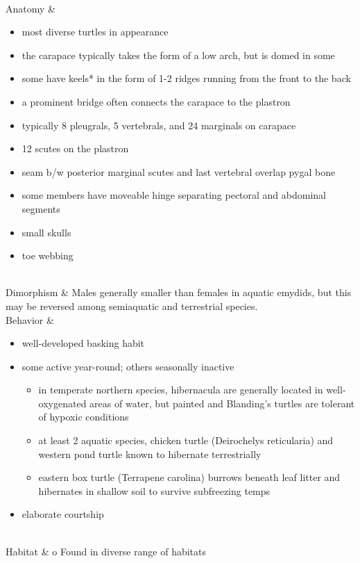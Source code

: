 \begin{center}
\begin{longtabu}
	 \\
	\hline
	Anatomy &
	\begin{itemize}[noitemsep]
		\item most diverse turtles in appearance
		\item the carapace typically takes the form of a low arch, but is domed in some
		\item some have keels* in the form of 1-2 ridges running from the front to the back
		\item a prominent bridge often connects the carapace to the plastron
		\item typically 8 pleugrals, 5 vertebrals, and 24 marginals on carapace
		\item 12 scutes on the plastron
		\item seam b/w posterior marginal scutes and last vertebral overlap pygal bone
		\item some members have moveable hinge separating pectoral and abdominal segments
		\item small skulls
		\item toe webbing
	\end{itemize}
	 \\
	\hline
	Dimorphism & 
	Males generally smaller than females in aquatic emydids, but this may be reversed among semiaquatic and terrestrial species.
	\\
	\hline
	Behavior & 
	\begin{itemize}[noitemsep]
		\item well-developed basking habit
		\item some active year-round; others seasonally inactive
			\begin{itemize}[noitemsep]
				\item in temperate northern species, hibernacula are generally located in well-oxygenated areas of water, but painted and Blanding's turtles are tolerant of hypoxic conditions
				\item at least 2 aquatic species, chicken turtle (Deirochelys reticularia) and western pond turtle known to hibernate terrestrially
				\item eastern box turtle  (Terrapene carolina) burrows beneath leaf litter and hibernates in shallow soil to survive subfreezing temps
			\end{itemize}
		\item elaborate courtship
	\end{itemize}
	\\
	\hline
	Habitat & 
	o	Found in diverse range of habitats

\end{longtabu}
\end{center}
